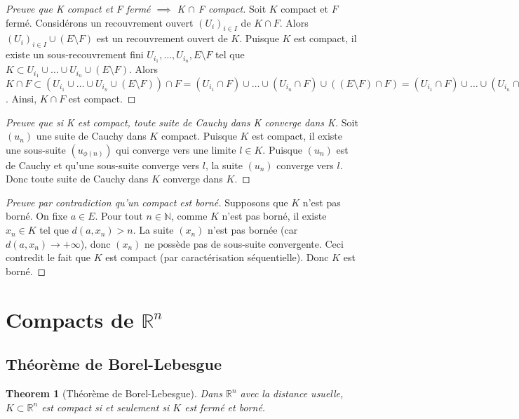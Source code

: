\documentclass{article}
\newtheorem{theorem}{Theorem}
\begin{document}
\begin{proof}[Preuve que K compact et F fermé $\implies$ K $\cap$ F compact]
Soit $K$ compact et $F$ fermé. Considérons un recouvrement ouvert $(U_i)_{i \in I}$ de $K \cap F$. Alors $(U_i)_{i \in I} \cup (E \setminus F)$ est un recouvrement ouvert de $K$. Puisque $K$ est compact, il existe un sous-recouvrement fini $U_{i_1}, \dots, U_{i_n}, E \setminus F$ tel que $K \subset U_{i_1} \cup \dots \cup U_{i_n} \cup (E \setminus F)$. Alors $K \cap F \subset (U_{i_1} \cup \dots \cup U_{i_n} \cup (E \setminus F)) \cap F = (U_{i_1} \cap F) \cup \dots \cup (U_{i_n} \cap F) \cup ((E \setminus F) \cap F) = (U_{i_1} \cap F) \cup \dots \cup (U_{i_n} \cap F) \subset U_{i_1} \cup \dots \cup U_{i_n}$. Ainsi, $K \cap F$ est compact.
\end{proof}

\begin{proof}[Preuve que si K est compact, toute suite de Cauchy dans K converge dans K]
Soit $(u_n)$ une suite de Cauchy dans $K$ compact. Puisque $K$ est compact, il existe une sous-suite $(u_{\phi(n)})$ qui converge vers une limite $l \in K$. Puisque $(u_n)$ est de Cauchy et qu'une sous-suite converge vers $l$, la suite $(u_n)$ converge vers $l$. Donc toute suite de Cauchy dans $K$ converge dans $K$.
\end{proof}

\begin{proof}[Preuve par contradiction qu'un compact est borné]
Supposons que $K$ n'est pas borné. On fixe $a \in E$. Pour tout $n \in \mathbb{N}$, comme $K$ n'est pas borné, il existe $x_n \in K$ tel que $d(a, x_n) > n$. La suite $(x_n)$ n'est pas bornée (car $d(a, x_n) \to +\infty$), donc $(x_n)$ ne possède pas de sous-suite convergente. Ceci contredit le fait que $K$ est compact (par caractérisation séquentielle). Donc $K$ est borné.
\end{proof}

\section{Compacts de $\mathbb{R}^n$}

\subsection{Théorème de Borel-Lebesgue}

\begin{theorem}[Théorème de Borel-Lebesgue]
Dans $\mathbb{R}^n$ avec la distance usuelle, $K \subset \mathbb{R}^n$ est compact si et seulement si $K$ est fermé et borné.
\end{theorem}
\end{document}
